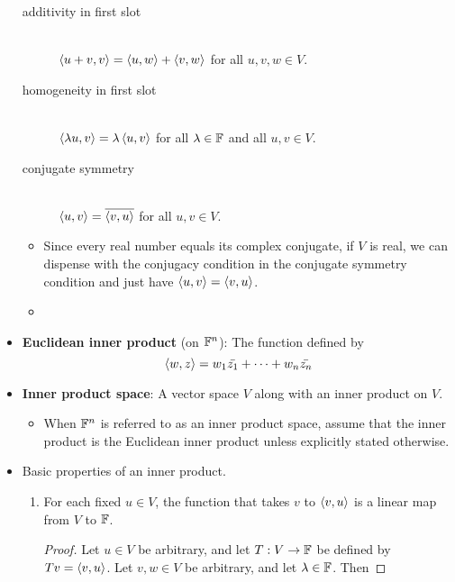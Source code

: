 \documentclass[../main.tex]{subfiles}
\begin{document}
\begin{itemize}
\begin{description}
        \item[additivity in first slot] \hfill\\ $\left\langle{u+v},{v}\right\rangle=\left\langle{u},{w}\right\rangle+\left\langle{v},{w}\right\rangle$ for all $u,v,w\in V$.
        \item[homogeneity in first slot] \hfill\\ $\left\langle{\lambda u},{v}\right\rangle=\lambda\left\langle{u},{v}\right\rangle$ for all $\lambda\in\mathbb{F}$ and all $u,v\in V$.
        \item[conjugate symmetry] \hfill\\ $\left\langle{u},{v}\right\rangle=\overline{\left\langle{v},{u}\right\rangle}$ for all $u,v\in V$.
    \end{description}
    \begin{itemize}
        \item Since every real number equals its complex conjugate, if $V$ is real, we can dispense with the conjugacy condition in the conjugate symmetry condition and just have $\left\langle{u},{v}\right\rangle=\left\langle{v},{u}\right\rangle$.
        \item {}
    \end{itemize}
    \item \textbf{Euclidean inner product} (on $\mathbb{F}^n$): The function defined by
    \begin{equation*}
        \left\langle{w},{z}\right\rangle = w_1\bar{z_1}+\cdots+w_n\bar{z_n}
    \end{equation*}
    \item \textbf{Inner product space}: A vector space $V$ along with an inner product on $V$.
    \begin{itemize}
        \item When $\mathbb{F}^n$ is referred to as an inner product space, assume that the inner product is the Euclidean inner product unless explicitly stated otherwise.
    \end{itemize}
    \item Basic properties of an inner product.
    \begin{theorem}\label{trm:inpProperties}\leavevmode
        \begin{enumerate}[label={\textup{(}\alph*\textup{)}},ref={\thetheorem\alph*}]
            \item \label{trm:inpPropertiesa}For each fixed $u\in V$, the function that takes $v$ to $\left\langle{v},{u}\right\rangle$ is a linear map from $V$ to $\mathbb{F}$.
            \begin{proof}
                Let $u\in V$ be arbitrary, and let $T:V\to\mathbb{F}$ be defined by $Tv=\left\langle{v},{u}\right\rangle$. Let $v,w\in V$ be arbitrary, and let $\lambda\in\mathbb{F}$. Then

\end{proof}
\end{enumerate}
\end{theorem}
\end{itemize}
\end{document}
